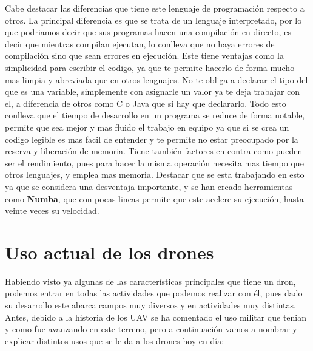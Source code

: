	Cabe destacar las diferencias que tiene este lenguaje de programaci\'on respecto a otros. La principal diferencia es que se trata de un lenguaje interpretado, por lo que podriamos decir que sus programas hacen una compilaci\'on en directo, es decir que mientras compilan ejecutan, lo conlleva que no haya errores de compilaci\'on sino que sean errores en ejecuci\'on. Este tiene ventajas como la simplicidad para escribir el codigo, ya que te permite hacerlo de forma mucho mas limpia y abreviada que en otros lenguajes. No te obliga a declarar el tipo del que es una variable, simplemente con asignarle un valor ya te deja trabajar con el, a diferencia de otros como C o Java que si hay que declararlo. Todo esto conlleva que el tiempo de desarrollo en un programa se reduce de forma notable, permite que sea mejor y mas fluido el trabajo en equipo ya que si se crea un codigo legible es mas facil de entender y te permite no estar preocupado por la reserva y liberaci\'on de memoria. Tiene tambi\'en factores en contra como pueden ser el rendimiento, pues para hacer la misma operaci\'on necesita mas tiempo que otros lenguajes, y emplea mas memoria. Destacar que se esta trabajando en esto ya que se considera una desventaja importante, y se han creado herramientas como \textbf{Numba}, que con pocas lineas permite que este acelere su ejecuci\'on, hasta veinte veces su velocidad. 
	

\section{Uso actual de los drones}
Habiendo visto ya algunas de las caracter\'isticas principales que tiene un dron, podemos entrar en todas las actividades que podemos realizar con \'el, pues dado su desarrollo este abarca campos muy diversos y en actividades muy distintas. Antes, debido a la historia de los UAV se ha comentado el uso militar que tenian y como fue avanzando en este terreno, pero a continuaci\'on vamos a nombrar y explicar distintos usos que se le da a los drones hoy en d\'ia:

